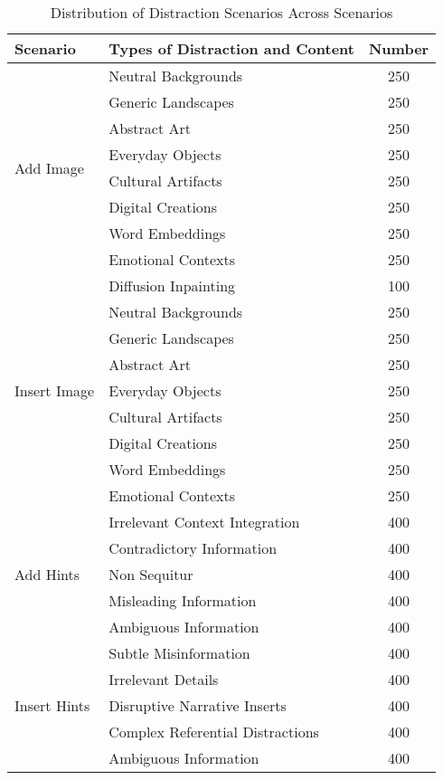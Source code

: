 \begin{table*}[h]
    \centering
    \begin{tabular}{p{2.5cm}p{7cm}c}
        \toprule
        \textbf{Scenario} & \textbf{Types of Distraction and Content} & \textbf{Number} \\
        \midrule
        \multirow{8}{*}{Add Image} 
            & Neutral Backgrounds & 250 \\ 
            & Generic Landscapes & 250 \\ 
            & Abstract Art & 250 \\ 
            & Everyday Objects & 250 \\ 
            & Cultural Artifacts & 250 \\ 
            & Digital Creations & 250 \\ 
            & Word Embeddings & 250 \\ 
            & Emotional Contexts & 250 \\ 
        \midrule
        \multirow{9}{*}{Insert Image}
            & Diffusion Inpainting & 100 \\
            & Neutral Backgrounds & 250 \\ 
            & Generic Landscapes & 250 \\ 
            & Abstract Art & 250 \\ 
            & Everyday Objects & 250 \\ 
            & Cultural Artifacts & 250 \\ 
            & Digital Creations & 250 \\ 
            & Word Embeddings & 250 \\ 
            & Emotional Contexts & 250 \\ 
        \midrule
        \multirow{5}{*}{Add Hints} 
            & Irrelevant Context Integration & 400 \\ 
            & Contradictory Information & 400 \\ 
            & Non Sequitur & 400 \\ 
            & Misleading Information & 400 \\ 
            & Ambiguous Information & 400 \\ 
        \midrule
        \multirow{5}{*}{Insert Hints} 
            & Subtle Misinformation & 400 \\ 
            & Irrelevant Details & 400 \\ 
            & Disruptive Narrative Inserts & 400 \\ 
            & Complex Referential Distractions & 400 \\ 
            & Ambiguous Information & 400 \\ 
        \bottomrule
    \end{tabular}
    \caption{Distribution of Distraction Scenarios Across Scenarios}
    \label{tab:dataset statistics}
\end{table*}

